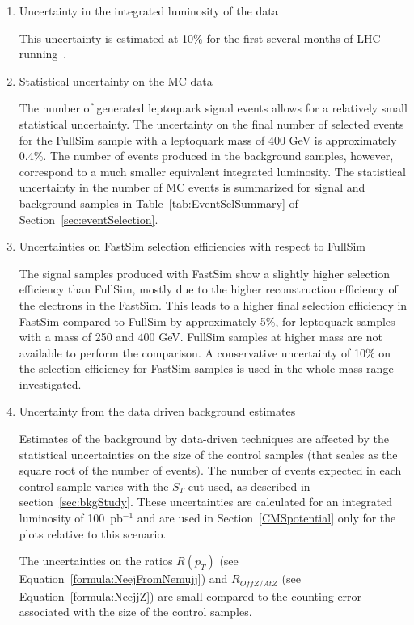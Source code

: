 \begin{enumerate}
\item Uncertainty in the integrated luminosity of the data

This uncertainty is estimated at 10\% for the first several months of LHC running~\cite{Ball:2007zza}. 
%
\item Statistical uncertainty on the MC data

The number of generated leptoquark signal events allows for a relatively small statistical uncertainty.
The uncertainty on the final number of selected events for the FullSim sample with a leptoquark mass of 400 GeV is 
approximately 0.4\%.  The number of events produced in the background samples, however, correspond to a much
smaller equivalent integrated luminosity.  
The statistical uncertainty in the number of MC events is summarized for signal and background samples 
in Table~\ref{tab:EventSelSummary} of Section~\ref{sec:eventSelection}.  
%
\item Uncertainties on FastSim selection efficiencies with respect to FullSim

The signal samples produced with FastSim show a slightly higher selection efficiency than FullSim, 
mostly due to the higher reconstruction efficiency of the electrons in the FastSim. 
This leads to a higher final selection efficiency in FastSim compared to FullSim by approximately 5\%, 
for leptoquark samples with a mass of 250 and 400 GeV. FullSim samples at higher mass are not available 
to perform the comparison. A conservative uncertainty of 10\% on the selection efficiency 
for FastSim samples is used in the whole mass range investigated. 
%
\item Uncertainty from the data driven background estimates

Estimates of the background by data-driven techniques are affected by the statistical
uncertainties on the size of the control samples (that scales as the square root of the number of events).
The number of events expected in each control sample varies with the $S_T$ cut used, as 
described in section~\ref{sec:bkgStudy}. 
These uncertainties are calculated for an integrated luminosity of 100~pb$^{-1}$ 
and are used in Section~\ref{CMSpotential} only for the plots relative to this scenario.

The uncertainties on the ratios $R(p_{T})$ (see Equation~\ref{formula:NeejFromNemujj})
and $R_{OffZ/AtZ}$ (see Equation~\ref{formula:NeejjZ})
are small compared to the counting error associated with the
size of the control samples.


\end{enumerate}
